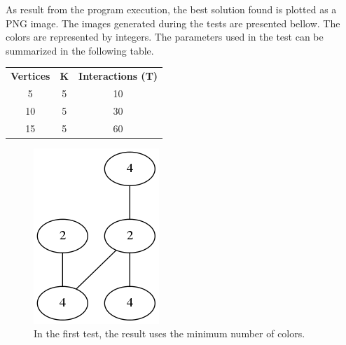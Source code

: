 \documentclass[11pt]{article}
\begin{document}
As result from the program execution, the best solution found is plotted as a PNG image. The images generated during the tests are presented bellow. The colors are represented by integers. The parameters used in the test can be summarized in the following table.
\begin{table}[ht]
\centering
\begin{tabular}{|c|c|c|}
\cline{1-3}
\textbf{Vertices} & \textbf{K} & \textbf{Interactions (T)} \\ \cline{1-3}
5                 & 5          & 10          \\ \cline{1-3}
10                & 5          & 30          \\ \cline{1-3}
15                & 5          & 60          \\ \cline{1-3}
\end{tabular}
\end{table}



\begin{figure}[!htb]
\centering
\includegraphics[scale=0.5]{a.png}
\caption{In the first test, the result uses the minimum number of colors.}
\end{figure}
\end{document}
